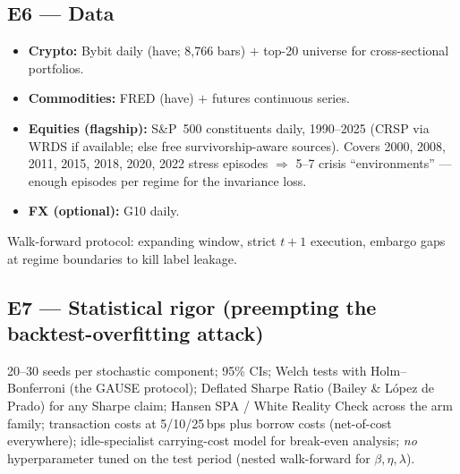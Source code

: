 \documentclass[11pt]{article}
\begin{document}
\subsection{E6 --- Data}
\begin{itemize}
  \item \textbf{Crypto:} Bybit daily (have; 8{,}766 bars) $+$ top-20 universe for cross-sectional portfolios.
  \item \textbf{Commodities:} FRED (have) $+$ futures continuous series.
  \item \textbf{Equities (flagship):} S\&P~500 constituents daily, 1990--2025 (CRSP via WRDS if available; else free survivorship-aware sources). Covers 2000, 2008, 2011, 2015, 2018, 2020, 2022 stress episodes $\Rightarrow$ 5--7 crisis ``environments'' --- enough episodes per regime for the invariance loss.
  \item \textbf{FX (optional):} G10 daily.
\end{itemize}
Walk-forward protocol: expanding window, strict $t{+}1$ execution, embargo gaps at regime boundaries to kill label leakage.

\subsection{E7 --- Statistical rigor (preempting the backtest-overfitting attack)}
20--30 seeds per stochastic component; 95\% CIs; Welch tests with Holm--Bonferroni (the GAUSE protocol); Deflated Sharpe Ratio (Bailey \& L\'opez de Prado) for any Sharpe claim; Hansen SPA / White Reality Check across the arm family; transaction costs at 5/10/25\,bps plus borrow costs (net-of-cost everywhere); idle-specialist carrying-cost model for break-even analysis; \emph{no} hyperparameter tuned on the test period (nested walk-forward for $\beta,\eta,\lambda$).
\end{document}
